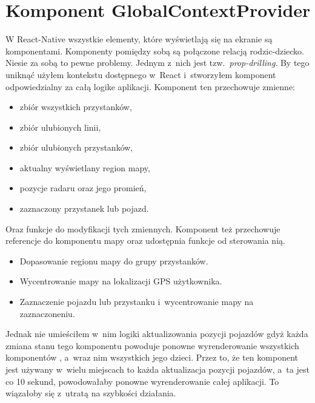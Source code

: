 \documentclass{SGGW-thesis}
\begin{document}
\section{Komponent GlobalContextProvider}
W React-Native wszystkie elementy, które wyświetlają się na ekranie są komponentami.
Komponenty pomiędzy sobą są połączone relacją rodzic-dziecko.
Niesie za sobą to pewne problemy.
Jednym z~nich jest tzw.~\textit{prop-drilling}. %
By tego uniknąć użyłem kontekstu dostępnego w~React i~stworzyłem komponent  odpowiedzialny za całą logike aplikacji.
Komponent ten przechowuje zmienne:
\begin{itemize}
  \item{zbiór wszystkich przystanków,}
  \item{zbiór ulubionych linii,}
  \item{zbiór ulubionych przystanków,}
  \item{aktualny wyświetlany region mapy,}
  \item{pozycje radaru oraz jego promień,}
  \item{zaznaczony przystanek lub pojazd.}
\end{itemize}
Oraz funkcje do modyfikacji tych zmiennych. %
Komponent też przechowuje referencje do komponentu mapy oraz udostępnia funkcje od sterowania nią.
\begin{itemize}
  \item{Dopasowanie regionu mapy do grupy przystanków.}
  \item{Wycentrowanie mapy na lokalizacji GPS użytkownika.}
  \item{Zaznaczenie pojazdu lub przystanku i~wycentrowanie mapy na zaznaczoneniu.}
\end{itemize}

Jednak nie umieściłem w~nim logiki aktualizowania pozycji pojazdów gdyż każda zmiana stanu
tego komponentu powoduje ponowne wyrenderowanie wszystkich komponentów , a~wraz nim wszystkich jego dzieci.
Przez to, że ten komponent jest używany w~wielu miejscach to każda aktualizacja pozycji pojazdów, a~ta
jest co 10 sekund, powodowałaby ponowne wyrenderowanie całej aplikacji.
To wiązałoby się z~utratą na szybkości działania.
\end{document}
